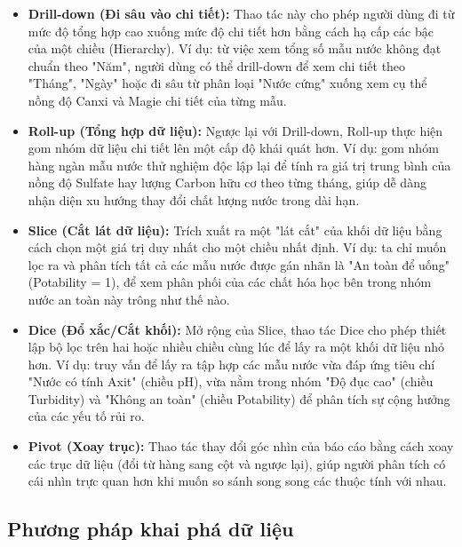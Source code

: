 \begin{itemize}
    \item \textbf{Drill-down (Đi sâu vào chi tiết):} 
    Thao tác này cho phép người dùng đi từ mức độ tổng hợp cao xuống mức độ chi tiết hơn bằng cách hạ cấp các bậc của một chiều (Hierarchy). Ví dụ: từ việc xem tổng số mẫu nước không đạt chuẩn theo "Năm", người dùng có thể drill-down để xem chi tiết theo "Tháng", "Ngày" hoặc đi sâu từ phân loại "Nước cứng" xuống xem cụ thể nồng độ Canxi và Magie chi tiết của từng mẫu.
    
    \item \textbf{Roll-up (Tổng hợp dữ liệu):} 
    Ngược lại với Drill-down, Roll-up thực hiện gom nhóm dữ liệu chi tiết lên một cấp độ khái quát hơn. Ví dụ: gom nhóm hàng ngàn mẫu nước thử nghiệm độc lập lại để tính ra giá trị trung bình của nồng độ Sulfate hay lượng Carbon hữu cơ theo từng tháng, giúp dễ dàng nhận diện xu hướng thay đổi chất lượng nước trong dài hạn.
    
    \item \textbf{Slice (Cắt lát dữ liệu):} 
    Trích xuất ra một "lát cắt" của khối dữ liệu bằng cách chọn một giá trị duy nhất cho một chiều nhất định. Ví dụ: ta chỉ muốn lọc ra và phân tích tất cả các mẫu nước được gán nhãn là "An toàn để uống" (Potability = 1), để xem phân phối của các chất hóa học bên trong nhóm nước an toàn này trông như thế nào.
    
    \item \textbf{Dice (Đổ xắc/Cắt khối):} 
    Mở rộng của Slice, thao tác Dice cho phép thiết lập bộ lọc trên hai hoặc nhiều chiều cùng lúc để lấy ra một khối dữ liệu nhỏ hơn. Ví dụ: truy vấn để lấy ra tập hợp các mẫu nước vừa đáp ứng tiêu chí "Nước có tính Axit" (chiều pH), vừa nằm trong nhóm "Độ đục cao" (chiều Turbidity) và "Không an toàn" (chiều Potability) để phân tích sự cộng hưởng của các yếu tố rủi ro.
    
    \item \textbf{Pivot (Xoay trục):} 
    Thao tác thay đổi góc nhìn của báo cáo bằng cách xoay các trục dữ liệu (đổi từ hàng sang cột và ngược lại), giúp người phân tích có cái nhìn trực quan hơn khi muốn so sánh song song các thuộc tính với nhau.
\end{itemize}





\subsection{Phương pháp khai phá dữ liệu}

